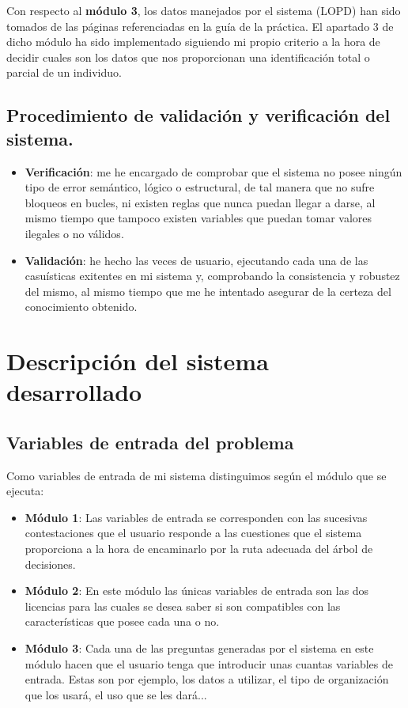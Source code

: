 Con respecto al \textbf{módulo 3}, los datos manejados por el sistema (LOPD) han sido tomados de las páginas referenciadas en la guía de la práctica.
El apartado 3 de dicho módulo ha sido implementado siguiendo mi propio criterio a la hora de decidir cuales son los datos que nos proporcionan una identificación total o parcial de un individuo.
\newpage

\subsection{Procedimiento de validación y verificación del sistema.}


\begin{itemize}
	\item \textbf{Verificación}: me he encargado de comprobar que el sistema no posee ningún tipo de error semántico, lógico o estructural, de tal manera que no sufre bloqueos en bucles, ni existen reglas que nunca puedan llegar a darse, al mismo tiempo que tampoco existen variables que puedan tomar valores ilegales o no válidos.
	\item \textbf{Validación}: he hecho las veces de usuario, ejecutando cada una de las casuísticas exitentes en mi sistema y, comprobando la consistencia y robustez del mismo, al mismo tiempo que me he intentado asegurar de la certeza del conocimiento obtenido.
\end{itemize}



\section{Descripción del sistema desarrollado}

\subsection{Variables de entrada del problema}

Como variables de entrada de mi sistema distinguimos según el módulo que se ejecuta:
\begin{itemize}
	\item \textbf{Módulo 1}: Las variables de entrada se corresponden con las sucesivas contestaciones que el usuario responde a las cuestiones que el sistema proporciona a la hora de encaminarlo por la ruta adecuada del árbol de decisiones.
	\item \textbf{Módulo 2}: En este módulo las únicas variables de entrada son las dos licencias para las cuales se desea saber si son compatibles con las características que posee cada una o no.
	\item \textbf{Módulo 3}: Cada una de las preguntas generadas por el sistema en este módulo hacen que el usuario tenga que introducir unas cuantas variables de entrada. Estas son por ejemplo, los datos a utilizar, el tipo de organización que los usará, el uso que se les dará...
\end{itemize}


